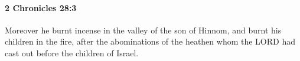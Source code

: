 
		\paragraph{2 Chronicles 28:3} %
			\label{2CHRONICLES-28-3}

			Moreover he burnt incense in the valley of the son of Hinnom, and burnt his children in the fire, after the abominations of the heathen whom the LORD had cast out before the children of Israel.


